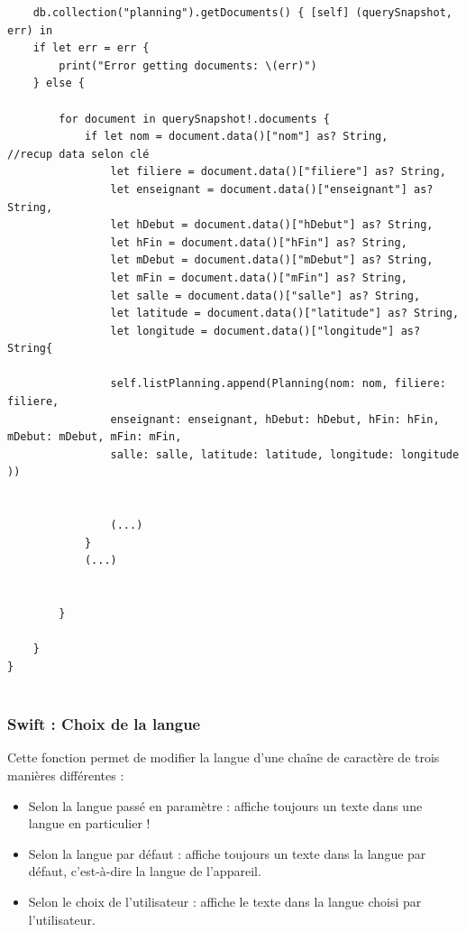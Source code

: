 \documentclass{article}
\begin{document}
\begin{verbatim}
    db.collection("planning").getDocuments() { [self] (querySnapshot, err) in
    if let err = err {
        print("Error getting documents: \(err)")
    } else {
        
        for document in querySnapshot!.documents {
            if let nom = document.data()["nom"] as? String,         //recup data selon clé
                let filiere = document.data()["filiere"] as? String,
                let enseignant = document.data()["enseignant"] as? String,
                let hDebut = document.data()["hDebut"] as? String,
                let hFin = document.data()["hFin"] as? String,
                let mDebut = document.data()["mDebut"] as? String,
                let mFin = document.data()["mFin"] as? String,
                let salle = document.data()["salle"] as? String,
                let latitude = document.data()["latitude"] as? String,
                let longitude = document.data()["longitude"] as? String{
            
                self.listPlanning.append(Planning(nom: nom, filiere: filiere,
                enseignant: enseignant, hDebut: hDebut, hFin: hFin, mDebut: mDebut, mFin: mFin,
                salle: salle, latitude: latitude, longitude: longitude ))
                

                (...)
            }
            (...)

            
        }
        
    }
}


\end{verbatim}

\subsubsection{Swift : Choix de la langue}
Cette fonction permet de modifier la langue d'une chaîne de caractère de trois manières différentes :

\begin{itemize}
    \item Selon la langue passé en paramètre : affiche toujours un texte dans une langue en particulier ! 

    \item Selon la langue par défaut : affiche toujours un texte dans la langue par défaut, c'est-à-dire la langue de l'appareil.

    \item Selon le choix de l'utilisateur : affiche le texte dans la langue choisi par l'utilisateur.
\end{itemize}
\end{document}
